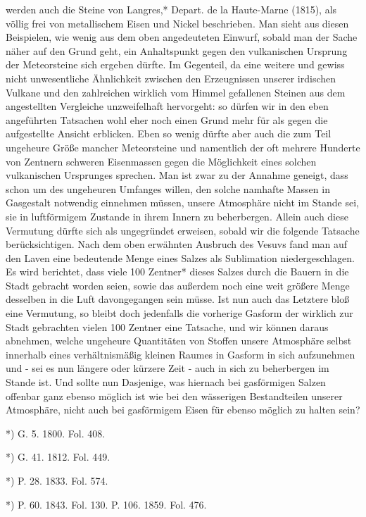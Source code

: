 \documentclass[a4paper, 11pt, oneside, polutonikogreek, german]{article}
\begin{document}
werden auch die Steine von Langres,* Depart. de la Haute-Marne (1815), als völlig frei von metallischem Eisen und Nickel beschrieben. Man sieht aus diesen Beispielen, wie wenig aus dem oben angedeuteten Einwurf, sobald man der Sache näher auf den Grund geht, ein Anhaltspunkt gegen den vulkanischen Ursprung der Meteorsteine sich ergeben dürfte. Im Gegenteil, da eine weitere und gewiss nicht unwesentliche Ähnlichkeit zwischen den Erzeugnissen unserer irdischen Vulkane und den zahlreichen wirklich vom Himmel gefallenen Steinen aus dem angestellten Vergleiche unzweifelhaft hervorgeht: so dürfen wir in den eben angeführten Tatsachen wohl eher noch einen Grund mehr für als gegen die aufgestellte Ansicht erblicken. Eben so wenig dürfte aber auch die zum Teil ungeheure Größe mancher Meteorsteine und namentlich der oft mehrere Hunderte von Zentnern schweren Eisenmassen gegen die Möglichkeit eines solchen vulkanischen Ursprunges sprechen. Man ist zwar zu der Annahme geneigt, dass schon um des ungeheuren Umfanges willen, den solche namhafte Massen in Gasgestalt notwendig einnehmen müssen, unsere Atmosphäre nicht im Stande sei, sie in luftförmigem Zustande in ihrem Innern zu beherbergen. Allein auch diese Vermutung dürfte sich als ungegründet erweisen, sobald wir die folgende Tatsache berücksichtigen. Nach dem oben erwähnten Ausbruch des Vesuvs fand man auf den Laven eine bedeutende Menge eines Salzes als Sublimation niedergeschlagen. Es wird berichtet, dass viele 100 Zentner* dieses Salzes durch die Bauern in die Stadt gebracht worden seien, sowie das außerdem noch eine weit größere Menge desselben in die Luft davongegangen sein müsse. Ist nun auch das Letztere bloß eine Vermutung, so bleibt doch jedenfalls die vorherige Gasform der wirklich zur Stadt gebrachten vielen 100 Zentner eine Tatsache, und wir können daraus abnehmen, welche ungeheure Quantitäten von Stoffen unsere Atmosphäre selbst innerhalb eines verhältnismäßig kleinen Raumes in Gasform in sich aufzunehmen und - sei es nun längere oder kürzere Zeit - auch in sich zu beherbergen im Stande ist. Und sollte nun Dasjenige, was hiernach bei gasförmigen Salzen offenbar ganz ebenso möglich ist wie bei den wässerigen Bestandteilen unserer Atmosphäre, nicht auch bei gasförmigem Eisen für ebenso möglich zu halten sein?

*) G. 5. 1800. Fol. 408.

*) G. 41. 1812. Fol. 449.

*) P. 28. 1833. Fol. 574.

*) P. 60. 1843. Fol. 130. P. 106. 1859. Fol. 476.
\end{document}
